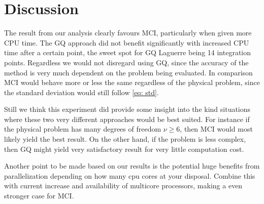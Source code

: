 \section{Discussion}
The result from our analysis clearly favours MCI, particularly when
given more CPU time. The GQ approach did not benefit significantly with
increased 
CPU time after a certain point, the sweet spot for GQ Laguerre being 14
integration points. Regardless we would not disregard using GQ, since the
accuracy of the method is very much dependent on the problem being evaluated.
In comparison MCI would behave more or less the same regardless of the physical
problem, since the standard deviation would still follow \cref{eq: std}. 

Still we think this experiment did provide some insight into the kind situations where
these two very different approaches would be best suited. For instance if the
physical problem has many degrees of freedom $\nu \ge 6 $, then MCI would most
likely yield the best result. On the other hand, if the problem is less complex,
then GQ might yield very satisfactory result for very little computation cost.  

Another point to be made based on our results is the potential huge benefits
from parallelization depending on how many cpu cores at your disposal. Combine
this with current increase and availability of multicore processors, making a
even stronger case for MCI. 